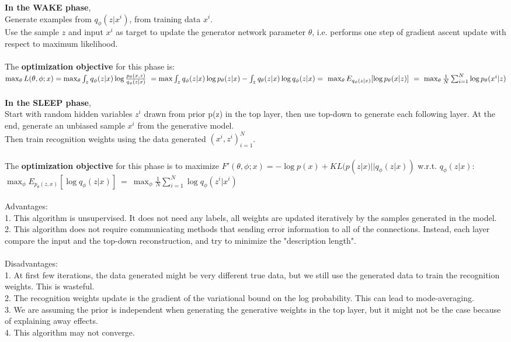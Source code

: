 \documentclass{article}
\begin{document}
\subsubsection{}
\textbf{In the WAKE phase}, \\
Generate examples from $q_{\phi}(z|x^i)$, from training data $x^i$. \\
Use the sample $z$ and input $x^i$ as target to update the generator network parameter $\theta$, i.e. performs one step of gradient ascent update with respect to maximum likelihood.
\\
\\
The \textbf{optimization objective} for this phase is:  \\
$\max_{\theta} L(\theta, \phi; x) = \max_{\theta} \int_z q_{\phi}(z|x)\log \frac{p_{\theta}(x, z)}{q_{\phi}(z|x)} \ = \max \int_z q_{\phi}(z|x)\log p_{\theta}(z|x) - \int_z q_{\theta}(z|x)\log q_{\phi}(z|x) \\
= \ \max_{\theta}E_{q_{\phi}(z|x)}[\log p_{\theta}(x|z)] \ = \ 
\max_{\theta}\frac{1}{N}\sum_{i=1}^N \log p_{\theta}(x^i|z)$
\\
\\
\textbf{In the SLEEP phase}, \\
Start with random hidden variables $z^i$ drawn from prior p(z) in the top layer, then use top-down to generate each following layer. At the end, generate an unbiased sample $x^i$ from the generative model. \\
Then train recognition weights using the data generated $(x^i, z^i)_{i=1}^N$.
\\
\\
The \textbf{optimization objective} for this phase is to maximize $F'(\theta, \phi; x) = -\log p(x) + KL(p(z|x) || q_{\phi}(z|x))$ w.r.t. $q_{\phi}(z|x)$: \\
$\max_{\phi}E_{p_{\theta}(z,x)}[\log q_{\phi}(z|x)]\ = \ \max_{\phi}\frac{1}{N}\sum_{i=1}^N \log q_{\phi}(z^i|x^i)$
\\
\\
Advantages: \\
1. This algorithm is unsupervised. It does not need any labels, all weights are updated iteratively by the samples generated in the model. \\
2. This algorithm does not require communicating methods that sending error information to all of the connections. Instead, each layer compare the input and the top-down reconstruction, and try to minimize the "description length".
\\
\\
Disadvantages: \\
1. At first few iterations, the data generated might be very different true data, but we still use the generated data to train the recognition weights. This is wasteful. \\
2. The recognition weights update is the gradient of the variational bound on the log probability. This can lead to mode-averaging. \\
3. We are assuming the prior is independent when generating the generative weights in the top layer, but it might not be the case because of explaining away effects. \\
4. This algorithm may not converge.
\end{document}
